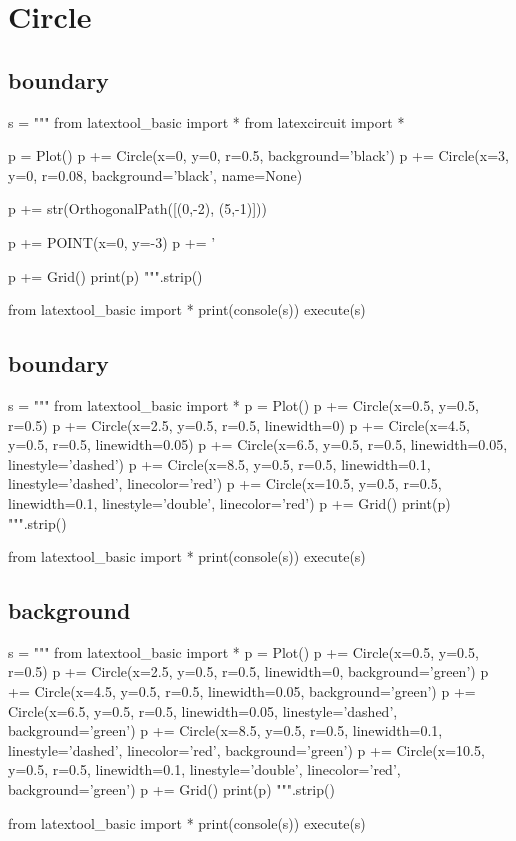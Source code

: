 \section{Circle}

\subsection{boundary}
\begin{python}
s = """
from latextool_basic import *
from latexcircuit import *

p = Plot()
p += Circle(x=0, y=0, r=0.5, background='black')
p += Circle(x=3, y=0, r=0.08, background='black', name=None)


p += str(OrthogonalPath([(0,-2), (5,-1)]))

p += POINT(x=0, y=-3)
p += '%

p += Grid()
print(p)
""".strip()

from latextool_basic import *
print(console(s))
execute(s)
\end{python}




\subsection{boundary}
\begin{python}
s = """
from latextool_basic import *
p = Plot()
p += Circle(x=0.5, y=0.5, r=0.5)
p += Circle(x=2.5, y=0.5, r=0.5, linewidth=0)
p += Circle(x=4.5, y=0.5, r=0.5, linewidth=0.05)
p += Circle(x=6.5, y=0.5, r=0.5, linewidth=0.05, linestyle='dashed')
p += Circle(x=8.5, y=0.5, r=0.5, linewidth=0.1, linestyle='dashed', 
                                 linecolor='red')
p += Circle(x=10.5, y=0.5, r=0.5, linewidth=0.1, linestyle='double', 
                                 linecolor='red')
p += Grid()
print(p)
""".strip()

from latextool_basic import *
print(console(s))
execute(s)
\end{python}


\newpage
\subsection{background}
\begin{python}
s = """
from latextool_basic import *
p = Plot()
p += Circle(x=0.5, y=0.5, r=0.5)
p += Circle(x=2.5, y=0.5, r=0.5, linewidth=0, background='green')
p += Circle(x=4.5, y=0.5, r=0.5, linewidth=0.05, background='green')
p += Circle(x=6.5, y=0.5, r=0.5, linewidth=0.05, linestyle='dashed',
                                 background='green')
p += Circle(x=8.5, y=0.5, r=0.5, linewidth=0.1, linestyle='dashed', 
                                 linecolor='red', background='green')
p += Circle(x=10.5, y=0.5, r=0.5, linewidth=0.1, linestyle='double', 
                                 linecolor='red', background='green')
p += Grid()
print(p)
""".strip()

from latextool_basic import *
print(console(s))
execute(s)
\end{python}




